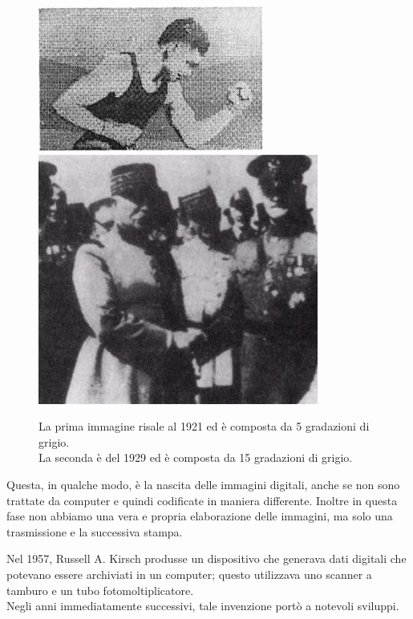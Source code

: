 \begin{figure}[htb] \centering
\includegraphics[scale=0.5, trim = 0 1.1cm 0 0, clip]{Pictures/img del 1921 a 5 gradazioni di grigio.jpg}
\qquad\qquad
\includegraphics[scale=1.7, trim = 0 1.1cm 0 0, clip]{Pictures/img del 1929 a 15 gradazioni di grigio.jpg}
\caption{La prima immagine risale al 1921 ed è composta da 5 gradazioni di grigio.\\ 
La seconda è del 1929 ed è composta da 15 gradazioni di grigio.}\label{fig:figura}
\end{figure}
\vspace{1em} \noindent
Questa, in qualche modo, è la nascita delle immagini digitali, anche se non sono trattate da computer e quindi codificate in maniera differente. Inoltre in questa fase non abbiamo una vera e propria elaborazione delle immagini, ma solo una trasmissione e la successiva stampa.

\vspace{1em} \noindent
Nel 1957, Russell A. Kirsch produsse un dispositivo che generava dati digitali che potevano essere archiviati in un computer; questo utilizzava uno scanner a tamburo e un tubo fotomoltiplicatore.\\
Negli anni immediatamente successivi, tale invenzione portò a notevoli sviluppi.


